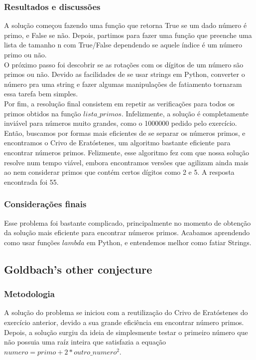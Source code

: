 \documentclass{article}
\begin{document}
        \subsubsection{Resultados e discussões}
        A solução começou fazendo uma função que retorna True se um dado número é primo, e False se não. Depois, partimos para fazer uma função que preenche uma lista de tamanho n com True/False dependendo se aquele índice é um número primo ou não.\\
        O próximo passo foi descobrir se as rotações com os dígitos de um número são primos ou não. Devido as facilidades de se usar strings em Python, converter o número pra uma string e fazer algumas manipulações de fatiamento tornaram essa tarefa bem simples.\\
        Por fim, a resolução final consistem em repetir as verificações para todos os primos obtidos na função $lista\_primos$. Infelizmente, a solução é completamente inviável para números muito grandes, como o 1000000 pedido pelo exercício. Então, buscamos por formas mais eficientes de se separar os números primos, e encontramos o Crivo de Eratóstenes, um algoritmo bastante eficiente para encontrar números primos. Felizmente, esse algoritmo fez com que nossa solução resolve num tempo viável, embora encontramos versões que agilizam ainda mais ao nem considerar primos que contém certos dígitos como 2 e 5.
        A resposta encontrada foi 55.
        
        \subsubsection{Considerações finais}
        Esse problema foi bastante complicado, principalmente no momento de obtenção da solução mais eficiente para encontrar números primos. Acabamos aprendendo como usar funções $lambda$ em Python, e entendemos melhor como fatiar Strings.
        
    \subsection{Goldbach's other conjecture}
        
        \subsubsection{Metodologia}
        A solução do problema se iniciou com a reutilização do Crivo de Eratóstenes do exercício anterior, devido a sua grande eficiência em encontrar número primos. Depois, a solução surgiu da ideia de simplesmente testar o primeiro número que não possuia uma raíz inteira que satisfazia a equação $numero = primo + 2 * outro\_numero^2$.
       
\end{document}
